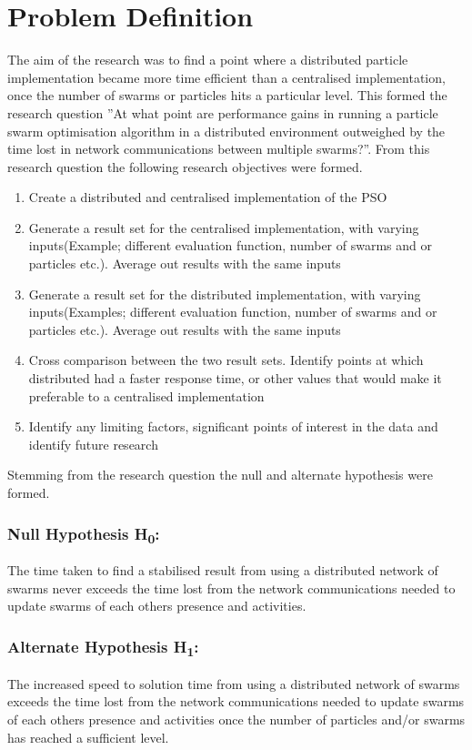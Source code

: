 \documentclass[oneside,12pt]{book}
\begin{document}
\section{Problem Definition}
The aim of the research was to find a point where a distributed particle implementation became more time efficient than a centralised implementation, once the number of swarms or particles hits a particular level. This formed the research question ”At what point are performance gains in running a particle swarm optimisation algorithm in a distributed environment outweighed by the time lost in network communications between multiple swarms?”. From this research question the following research objectives were formed. 
\begin{enumerate}
\item Create a distributed and centralised implementation of the PSO
\item Generate a result set for the centralised implementation, with varying inputs(Example; different evaluation function, number of swarms and or particles etc.). Average out results with the same inputs
\item Generate a result set for the distributed implementation, with varying inputs(Examples; different evaluation function, number of swarms and or particles etc.). Average out results with the same inputs
\item Cross comparison between the two result sets. Identify points at which distributed had a faster response time, or other values that would make it preferable to a centralised implementation
\item Identify any limiting factors, significant points of interest in the data and identify future research
\end{enumerate}
Stemming from the research question the null and alternate hypothesis were formed. 
\subsubsection{Null Hypothesis H\textsubscript{0}:}
The time taken to find a stabilised result from using a distributed network of swarms never exceeds the time lost from the network communications needed to update swarms of each others presence and activities.

\subsubsection{Alternate Hypothesis H\textsubscript{1}:}
The increased speed to solution time from using a distributed network of swarms exceeds the time lost from the network communications needed to update swarms of each others presence and activities once the number of particles and/or swarms has reached a sufficient level.
\end{document}
